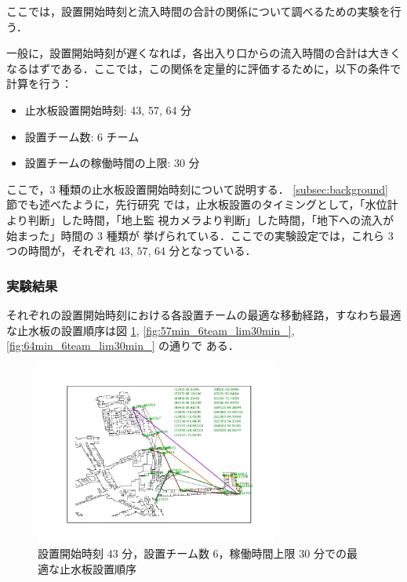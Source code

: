 \documentclass[a4paper,12pt,fleqn]{jarticle}
\begin{document}
ここでは，設置開始時刻と流入時間の合計の関係について調べるための実験を行
う．

一般に，設置開始時刻が遅くなれば，各出入り口からの流入時間の合計は大きく
なるはずである．ここでは，この関係を定量的に評価するために，以下の条件で
計算を行う：
%
\begin{itemize}
 \item 止水板設置開始時刻: 43, 57, 64 分
 \item 設置チーム数: 6 チーム
 \item 設置チームの稼働時間の上限: 30 分
\end{itemize}

ここで，$3$ 種類の止水板設置開始時刻について説明する．
%
\ref{subsec:background} 節でも述べたように，先行研究 \cite{武田さん卒論}
では，止水板設置のタイミングとして，「水位計より判断」した時間，「地上監
視カメラより判断」した時間，「地下への流入が始まった」時間の $3$ 種類が
挙げられている．ここでの実験設定では，これら $3$ つの時間が，それぞれ
$43$, $57$, $64$ 分となっている．

\subsubsection{実験結果}

それぞれの設置開始時刻における各設置チームの最適な移動経路，すなわち最適
な止水板の設置順序は図 \ref{fig:43min_6team_lim30min_},
\ref{fig:57min_6team_lim30min_}, \ref{fig:64min_6team_lim30min_} の通りで
ある．

\begin{figure}[htpb]
 \begin{center}
  \includegraphics[width=8cm,trim=100 50 100 50]{fig/43min_6team_lim30min.pdf}
  \caption{設置開始時刻 43 分，設置チーム数 6，稼働時間上限 30 分での最
  適な止水板設置順序}
  \label{fig:43min_6team_lim30min_}
 \end{center}
\end{figure}
\end{document}
